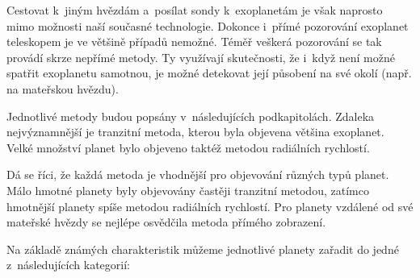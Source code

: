 \documentclass[a4paper,12pt]{article}
\begin{document}
Cestovat k~jiným hvězdám a~posílat sondy k~exoplanetám je však naprosto mimo možnosti naší současné technologie. Dokonce i~přímé pozorování exoplanet teleskopem je ve většině případů nemožné. Téměř veškerá pozorování se tak provádí skrze nepřímé metody. Ty využívají skutečnosti, že i~když není možné spatřit exoplanetu samotnou, je možné detekovat její působení na své okolí (např. na mateřskou hvězdu).

Jednotlivé metody budou popsány v~následujících podkapitolách. Zdaleka nejvýznamnější je tranzitní metoda, kterou byla objevena většina exoplanet. Velké množství planet bylo objeveno taktéž metodou radiálních rychlostí.~\cite{nasadata}


Dá se říci, že každá metoda je vhodnější pro objevování různých typů planet. Málo hmotné planety byly objevovány častěji tranzitní metodou, zatímco hmotnější planety spíše metodou radiálních rychlostí. Pro planety vzdálené od své mateřské hvězdy se nejlépe osvědčila metoda přímého zobrazení.~\cite{nasadata}


\newpage

Na základě známých charakteristik můžeme jednotlivé planety zařadit do jedné z~následujících kategorií:
\end{document}
